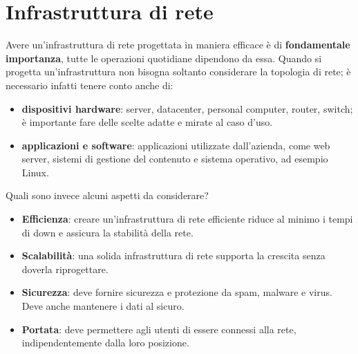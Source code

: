 \documentclass[12pt]{article}
\begin{document}
\section{Infrastruttura di rete}
Avere un'infrastruttura di rete progettata in maniera efficace è di \textbf{fondamentale importanza}, tutte le operazioni quotidiane dipendono da essa. Quando si progetta un'infrastruttura non bisogna soltanto considerare la topologia di rete; è necessario infatti tenere conto anche di:
\begin{itemize}
    \item \textbf{dispositivi hardware}: server, datacenter, personal computer, router, switch; è importante fare delle scelte adatte e mirate al caso d'uso.
    \item \textbf{applicazioni e software}: applicazioni utilizzate dall'azienda, come web server, sistemi di gestione del contenuto e sistema operativo, ad esempio Linux. 
\end{itemize}


Quali sono invece alcuni aspetti da considerare? 
\begin{itemize}
    \item \textbf{Efficienza}: creare un'infrastruttura di rete efficiente riduce al minimo i tempi di down e assicura la stabilità della rete.
    \item \textbf{Scalabilità}: una solida infrastruttura di rete supporta la crescita senza doverla riprogettare.
    \item \textbf{Sicurezza}: deve fornire sicurezza e protezione da spam, malware e virus. Deve anche mantenere i dati al sicuro.
    \item \textbf{Portata}: deve permettere agli utenti di essere connessi alla rete, indipendentemente dalla loro posizione.
\end{itemize}
\end{document}
